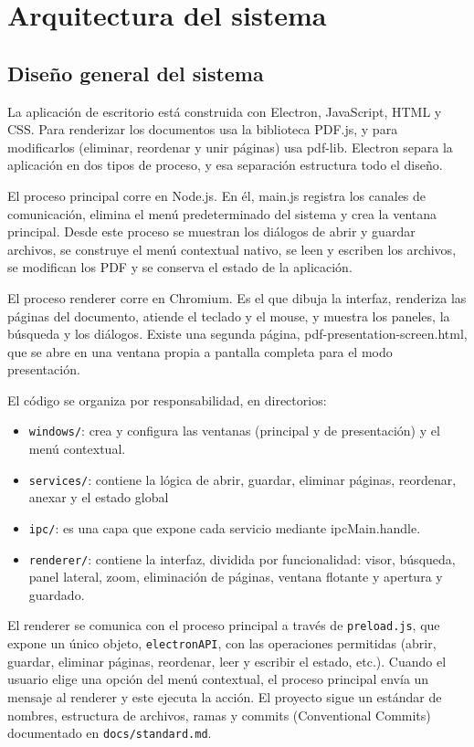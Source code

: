 \chapter{Arquitectura del sistema}
\section{Diseño general del sistema}
La aplicación de escritorio está construida con Electron, JavaScript, HTML y CSS. Para renderizar los documentos usa la biblioteca PDF.js, y para modificarlos (eliminar, reordenar y unir páginas) usa pdf-lib. Electron separa la aplicación en dos tipos de proceso, y esa separación estructura todo el diseño.

El proceso principal corre en Node.js. En él, main.js registra los canales de comunicación, elimina el menú predeterminado del sistema y crea la ventana principal. Desde este proceso se muestran los diálogos de abrir y guardar archivos, se construye el menú contextual nativo, se leen y escriben los archivos, se modifican los PDF y se conserva el estado de la aplicación.

El proceso renderer corre en Chromium. Es el que dibuja la interfaz, renderiza las páginas del documento, atiende el teclado y el mouse, y muestra los paneles, la búsqueda y los diálogos. Existe una segunda página, pdf-presentation-screen.html, que se abre en una ventana propia a pantalla completa para el modo presentación.

El código se organiza por responsabilidad, en directorios:

\begin{itemize}
  \item \verb|windows/|: crea y configura las ventanas (principal y de presentación) y el menú contextual.
  \item \verb|services/|: contiene la lógica de abrir, guardar, eliminar páginas, reordenar, anexar y el estado global
  \item \verb|ipc/|: es una capa que expone cada servicio mediante ipcMain.handle.
  \item \verb|renderer/|: contiene la interfaz, dividida por funcionalidad: visor, búsqueda, panel lateral, zoom, eliminación de páginas, ventana flotante y apertura y guardado.
\end{itemize}



 

El renderer se comunica con el proceso principal a través de \verb|preload.js|, que expone un único objeto, \verb|electronAPI|, con las operaciones permitidas (abrir, guardar, eliminar páginas, reordenar, leer y escribir el estado, etc.). Cuando el usuario elige una opción del menú contextual, el proceso principal envía un mensaje al renderer y este ejecuta la acción. El proyecto sigue un estándar de nombres, estructura de archivos, ramas y commits (Conventional Commits) documentado en \verb|docs/standard.md|.     

